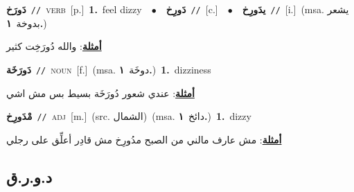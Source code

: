 \documentclass[10pt,a4paper,twoside]{article} %
\begin{document}
\begin{multicols}{2}
{\setlength\topsep{0pt}\textbf{\foreignlanguage{arabic}{دَورَخ}}\ {\color{gray}\texttt{//}\color{black}}\ \textsc{verb}\ [p.]\ \textbf{1.}~feel dizzy\ \ $\bullet$\ \ \setlength\topsep{0pt}\textbf{\foreignlanguage{arabic}{دَورِخ}}\ {\color{gray}\texttt{//}\color{black}}\ [c.]\ \ $\bullet$\ \ \setlength\topsep{0pt}\textbf{\foreignlanguage{arabic}{يدَورِخ}}\ {\color{gray}\texttt{//}\color{black}}\ [i.]\ \color{gray}(msa. \foreignlanguage{arabic}{يشعر بدوخة}~\foreignlanguage{arabic}{\textbf{١.}})\color{black}\  \begin{flushright}\color{gray}\foreignlanguage{arabic}{\textbf{\underline{\foreignlanguage{arabic}{أمثلة}}}: والله دُورَخِت كثير}\end{flushright}\color{black}} \vspace{2mm}

{\setlength\topsep{0pt}\textbf{\foreignlanguage{arabic}{دَورَخَة}}\ {\color{gray}\texttt{//}\color{black}}\ \textsc{noun}\ [f.]\ \color{gray}(msa. \foreignlanguage{arabic}{دوخَة}~\foreignlanguage{arabic}{\textbf{١.}})\color{black}\ \textbf{1.}~dizziness\  \begin{flushright}\color{gray}\foreignlanguage{arabic}{\textbf{\underline{\foreignlanguage{arabic}{أمثلة}}}: عندي شعور دُورَخَة بسيط بس مش اشي}\end{flushright}\color{black}} \vspace{2mm}

{\setlength\topsep{0pt}\textbf{\foreignlanguage{arabic}{مْدَورِخ}}\ {\color{gray}\texttt{//}\color{black}}\ \textsc{adj}\ [m.]\ (src. \color{gray}\foreignlanguage{arabic}{الشمال}\color{black})\ \color{gray}(msa. \foreignlanguage{arabic}{دائخ}~\foreignlanguage{arabic}{\textbf{١.}})\color{black}\ \textbf{1.}~dizzy\  \begin{flushright}\color{gray}\foreignlanguage{arabic}{\textbf{\underline{\foreignlanguage{arabic}{أمثلة}}}: مش عارف مالني من الصبح مدُورِخ مش قادِر أعلِّق على رجلي}\end{flushright}\color{black}} \vspace{2mm}

\vspace{-3mm}
\subsection*{\color{blue}\foreignlanguage{arabic}{د.و.ر.ق}\color{blue}{}} 


\end{multicols}
\end{document}
